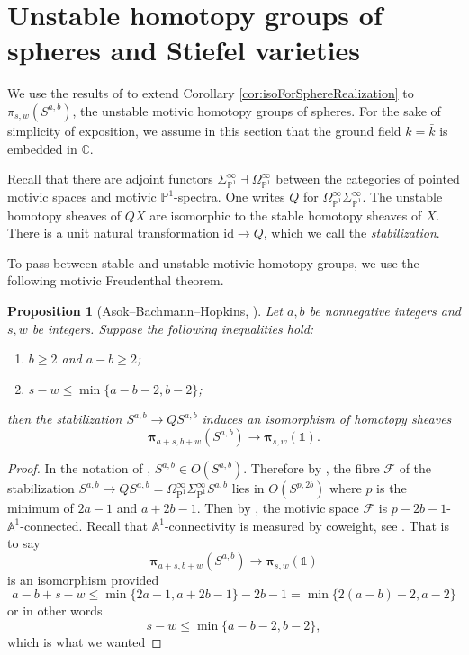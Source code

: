 \documentclass[11pt, oneside, dvipsnames, svgnames, table, final]{amsart}
\newcommand{\mathbx}[1]{\mathbb{#1}}
\theoremstyle{plain}
\newtheorem{proposition}[thm]{Proposition}
\theoremstyle{definition}
\theoremstyle{remark}
\newcommand{\C}{\mathbx{C}}
\newcommand{\A}{\mathbx{A}}
\newcommand{\PP}{\mathbx{P}}
\newcommand{\aone}{\A^1}
\newcommand{\Aone}{\aone}
\renewcommand{\P}{\operatorname{P}}
\newcommand{\sh}[1]{\mathcal{#1}}
\newcommand{\id}{\mathrm{id}}
\newcommand{\bpi}{\bm{\pi}}
\newcommand{\<}[1]{{\langle}#1 {\rangle}}
\newcommand{\one}{\mathbb{1}}
\begin{document}
\section{Unstable homotopy groups of spheres and  Stiefel varieties}
\label{sec:unst-homot-groups}

We use the results of \cite{Asok2024} to extend Corollary \ref{cor:isoForSphereRealization} to $\pi_{s,w}(S^{a,b})$, the unstable motivic homotopy groups of spheres. For the sake of simplicity of exposition, we assume in this section that the ground field $k=\bar k$ is embedded in $\C$.

Recall that there are adjoint functors $\Sigma_{\PP^1}^\infty \dashv \Omega^\infty_{\PP^1}$ between the categories of pointed motivic spaces and motivic $\PP^1$-spectra. One writes $Q$ for $\Omega^\infty_{\PP^1}\Sigma^\infty_{\PP^1}$. The unstable homotopy sheaves of $QX$ are isomorphic to the stable homotopy sheaves of $X$. There is a unit natural transformation $\id \to Q$, which we call the \emph{stabilization}.

To pass between stable and unstable motivic homotopy groups, we use the following motivic Freudenthal theorem.
\begin{proposition}[{Asok--Bachmann--Hopkins, \protect  \cite{Asok2024}}]\label{pr:motivicFreudenthalForSpheres}
  Let $a,b$ be nonnegative integers and $s,w$ be integers. Suppose the following inequalities hold:
  \begin{enumerate}
  \item $b \ge 2$ and $a-b \ge 2$;
  \item $s-w \le \min\{a-b-2,b-2\}$;
  \end{enumerate}
  then the stabilization $S^{a,b} \to Q S^{a,b}$ induces an isomorphism of homotopy sheaves
  \[ \bpi_{a+s,b+w}(S^{a,b}) \to \bpi_{s,w}(\one). \]  
\end{proposition}
\begin{proof}
  In the notation of \cite{Asok2024}, $S^{a,b} \in O(S^{a,b})$. Therefore by \cite[Theorem 6.3.4]{Asok2024}, the fibre $\sh F$ of the stabilization $S^{a,b} \to QS^{a,b} = \Omega^\infty_{\P^1} \Sigma^\infty_{\P^1} S^{a,b}$ lies in $O(S^{p,2b})$ where $p$ is the minimum of $2a-1$ and $a+2b-1$. Then by \cite[Lemma 3.1.19]{Asok2024}, the motivic space $\sh F$ is $p-2b-1$-$\Aone$-connected. Recall that $\Aone$-connectivity is measured by coweight, see \cite[p.~165]{Morel2012}. That is to say
    \begin{equation*}
      \bpi_{a+s,b+w}(S^{a,b}) \to \bpi_{s,w}(\one)
    \end{equation*}
  is an isomorphism provided
  \[ a-b+s-w \le \min\{2a-1, a+2b-1\}-2b-1 = \min\{2(a-b)-2, a-2\} \]
  or in other words
  \[ s-w \le \min\{a-b-2, b-2\}, \]
  which is what we wanted
\end{proof}
\end{document}
